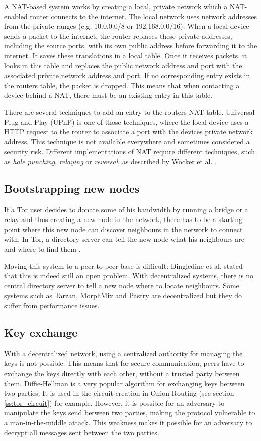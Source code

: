 \documentclass{article}
\begin{document}
		A NAT-based system works by creating a local, private network which a NAT-enabled router connects to the internet. The local network uses network addresses from the private ranges (e.g. 10.0.0.0/8 or 192.168.0.0/16). When a local device sends a packet to the internet, the router replaces these private addresses, including the source ports, with its own public address before forwarding it to the internet. It saves these translations in a local table. Once it receives packets, it looks in this table and replaces the public network address and port with the associated private network address and port. If no corresponding entry exists in the routers table, the packet is dropped. This means that when contacting a device behind a NAT, there must be an existing entry in this table.
		
		There are several techniques to add an entry to the routers NAT table. Universal Plug and Play (UPnP) is one of those techniques, where the local device uses a HTTP request to the router to associate a port with the devices private network address. This technique is not available everywhere and sometimes considered a security risk. Different implementations of NAT require different techniques, such as \textit{hole punching}, \textit{relaying} or \textit{reversal}, as described by Wocker et al. \cite{wacker2008nat}.


	\subsection{Bootstrapping new nodes}
		If a Tor user decides to donate some of his bandwidth by running a bridge or a relay and thus creating a new node in the network, there has to be a starting point where this new node can discover neighbours in the network to connect with. In Tor, a directory server can tell the new node what his neighbours are and where to find them \cite{dingledine2004tor}.
		
		Moving this system to a peer-to-peer base is difficult: Dingledine et al. stated that this is indeed still an open problem. With decentralized systems, there is no central directory server to tell a new node where to locate neighbours. Some systems such as Tarzan, MorphMix and Pastry \cite{rowstron2001pastry, rennhard2002introducing} are decentralized but they do suffer from performance issues.

	\subsection{Key exchange}
		With a decentralized network, using a centralized authority for managing the keys is not possible. This means that for secure communication, peers have to exchange the keys directly with each other, without a trusted party between them. Diffie-Hellman is a very popular algorithm for exchanging keys between two parties. It is used in the circuit creation in Onion Routing (see section \ref{ss:tor_circuit}) for example. However, it is possible for an adversary to manipulate the keys send between two parties, making the protocol vulnerable to a man-in-the-middle attack. This weakness makes it possible for an adversary to decrypt all messages sent between the two parties.
\end{document}
